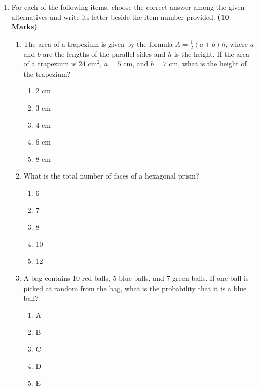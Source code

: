 \documentclass[12pt]{article}
\newenvironment{questionblock}[1][10]{
    \par\Needspace{#1\baselineskip}
}{
    \par
}
\begin{document}
\begin{enumerate}
  \item For each of the following items, choose the correct answer among the given alternatives and write its letter beside the item number provided. \textbf{(10 Marks)}

  \begin{enumerate}[label=(\roman*)]

    \begin{questionblock}
      \item The area of a trapezium is given by the formula $A = \frac{1}{2}(a + b)h$, where $a$ and $b$ are the lengths of the parallel sides and $h$ is the height. If the area of a trapezium is $24 \text{ cm}^2$, $a = 5 \text{ cm}$, and $b = 7 \text{ cm}$, what is the height of the trapezium?
      \begin{enumerate}[label=\Alph*.]
        \item 2 cm
        \item 3 cm
        \item 4 cm
        \item 6 cm
        \item 8 cm
      \end{enumerate}
      \vspace{0.8em}
    \end{questionblock}

    \begin{questionblock}
      \item What is the total number of faces of a hexagonal prism?
      \begin{enumerate}[label=\Alph*.]
        \item 6
        \item 7
        \item 8
        \item 10
        \item 12
      \end{enumerate}
      \vspace{0.8em}
    \end{questionblock}

    \begin{questionblock}
      \item A bag contains 10 red balls, 5 blue balls, and 7 green balls. If one ball is picked at random from the bag, what is the probability that it is a blue ball?
      \begin{enumerate}[label=\Alph*.]
        \item A
        \item B
        \item C
        \item D
        \item E
      \end{enumerate}
      \vspace{0.8em}
    \end{questionblock}


\end{enumerate}
\end{enumerate}
\end{document}
